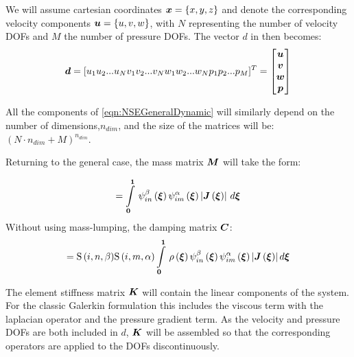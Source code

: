  We will assume cartesian coordinates $\boldsymbol{x}=\left\{ x,y,z \right\}$ and denote the corresponding velocity components $\boldsymbol{u}=\left\{ u,v,w \right\}$, with $N$ representing the number of velocity DOFs and $M$ the number of pressure DOFs. The vector $d$ in then becomes:
\begin{equation}
  \boldsymbol{d}=[u_1u_2...u_Nv_1v_2...v_Nw_1w_2...w_Np_1p_2...p_M]^T=
  \begin{bmatrix}\boldsymbol{u}\\\boldsymbol{v}\\\boldsymbol{w}\\\boldsymbol{p}\end{bmatrix}
\end{equation}

All the components of \ref{eqn:NSEGeneralDynamic} will similarly depend on the number of dimensions,$n_{dim}$, and the size of the matrices will be: $(N{\cdot}{n_{dim}}+M)^{n_{dim}}$. 

Returning to the general case, the mass matrix $\matr{M}$ will take the form:

\begin{equation}
[M^{\alpha\beta}_{mn}]=\gint{\vectr{0}}{\vectr{1}}{\idxgbfn{i}{n}{\beta}{\vectr{\xi}}\idxgbfn{i}{m}{\alpha}{\vectr{\xi}}
    \abs{\fnof{\matr{J}}{\vectr{\xi}}}}{\vectr{\xi}}
\end{equation}
Without using mass-lumping, the damping matrix $\matr{C}$:
\begin{equation}
  [C^{\alpha\beta}_{mn}]={\idxgsf{i}{n}{\beta}}{\idxgsf{i}{m}{\alpha}}
  \gint{\vectr{0}}{\vectr{1}}{\fnof{\rho}{\vectr{\xi}}{\idxgbfn{i}{n}{\beta}{\vectr{\xi}}\idxgbfn{i}{m}{\alpha}{\vectr{\xi}}
    \abs{\fnof{\matr{J}}{\vectr{\xi}}}}}{\vectr{\xi}}
\end{equation}

The element stiffness matrix $\matr{K}$ will contain the linear components of the system. For the classic Galerkin formulation this includes the viscous term with the laplacian operator and the pressure gradient term. As the velocity and pressure DOFs are both included in $d$, $\matr{K}$ will be assembled so that the corresponding operators are applied to the DOFs discontinuously. 

